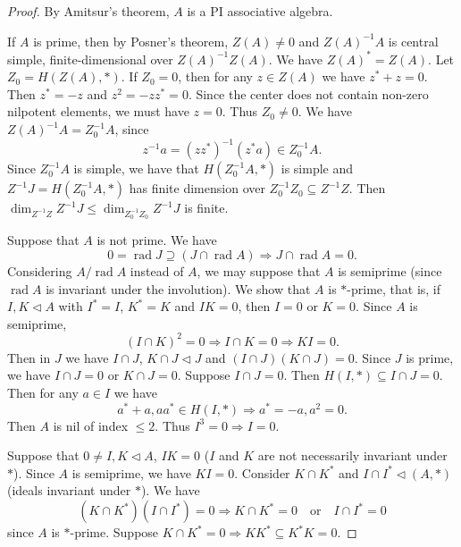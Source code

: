 \documentclass{article}
\begin{document}
\begin{proof}
By Amitsur's theorem, $A$ is a PI associative algebra.

If $A$ is prime, then by Posner's theorem, $Z(A) \neq 0$ and $Z(A)^{-1}A$ is central simple, finite-dimensional over $Z(A)^{-1}Z(A)$. We have $Z(A)^* = Z(A)$. Let $Z_0 = H(Z(A), *)$. If $Z_0 = 0$, then for any $z \in Z(A)$ we have $z^* + z = 0$. Then $z^* = -z$ and $z^2 = -zz^* = 0$. Since the center does not contain non-zero nilpotent elements, we must have $z = 0$. Thus $Z_0 \neq 0$. We have $Z(A)^{-1}A = Z_0^{-1}A$, since
\[
z^{-1}a = (zz^*)^{-1}(z^*a) \in Z_0^{-1}A.
\]
Since $Z_0^{-1}A$ is simple, we have that $H(Z_0^{-1}A, *)$ is simple and $Z^{-1}J = H(Z_0^{-1}A, *)$ has finite dimension over $Z_0^{-1}Z_0 \subseteq Z^{-1}Z$. Then $\dim_{Z^{-1}Z} Z^{-1}J \leq \dim_{Z_0^{-1}Z_0} Z^{-1}J$ is finite.

Suppose that $A$ is not prime. We have
\[
0 = \operatorname{rad} J \supseteq (J \cap \operatorname{rad} A) \Rightarrow J \cap \operatorname{rad} A = 0.
\]
Considering $A/\operatorname{rad} A$ instead of $A$, we may suppose that $A$ is semiprime (since $\operatorname{rad} A$ is invariant under the involution). We show that $A$ is $*$-prime, that is, if $I, K \triangleleft A$ with $I^* = I$, $K^* = K$ and $IK = 0$, then $I = 0$ or $K = 0$. Since $A$ is semiprime,
\[
(I \cap K)^2 = 0 \Rightarrow I \cap K = 0 \Rightarrow KI = 0.
\]
Then in $J$ we have $I \cap J$, $K \cap J \triangleleft J$ and $(I \cap J)(K \cap J) = 0$. Since $J$ is prime, we have $I \cap J = 0$ or $K \cap J = 0$. Suppose $I \cap J = 0$. Then $H(I, *) \subseteq I \cap J = 0$. Then for any $a \in I$ we have
\[
a^* + a, aa^* \in H(I, *) \Rightarrow a^* = -a, a^2 = 0.
\]
Then $A$ is nil of index $\leq 2$. Thus $I^3 = 0 \Rightarrow I = 0$.

Suppose that $0 \neq I, K \triangleleft A$, $IK = 0$ ($I$ and $K$ are not necessarily invariant under $*$). Since $A$ is semiprime, we have $KI = 0$. Consider $K \cap K^*$ and $I \cap I^* \triangleleft (A, *)$ (ideals invariant under $*$). We have
\[
(K \cap K^*)(I \cap I^*) = 0 \Rightarrow K \cap K^* = 0 \quad \text{or} \quad I \cap I^* = 0
\]
since $A$ is $*$-prime. Suppose $K \cap K^* = 0 \Rightarrow KK^* \subseteq K^*K = 0$.


\end{proof}
\end{document}

